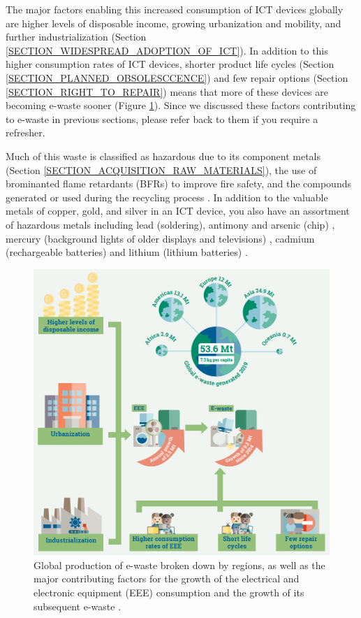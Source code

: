 \documentclass{article}
\begin{document}
The major factors enabling this increased consumption of ICT devices globally are higher levels of disposable income, growing urbanization and mobility, and further industrialization (Section \ref{SECTION_WIDESPREAD_ADOPTION_OF_ICT}). In addition to this higher consumption rates of ICT devices, shorter product life cycles (Section \ref{SECTION_PLANNED_OBSOLESCCENCE}) and few repair options (Section \ref{SECTION_RIGHT_TO_REPAIR}) means that more of these devices are becoming e-waste sooner (Figure \ref{Global_e_waste_stats}). Since we discussed these factors contributing to e-waste in previous sections, please refer back to them if you require a refresher.

Much of this waste is classified as hazardous due to its component metals (Section \ref{SECTION_ACQUISITION_RAW_MATERIALS}), the use of brominanted flame retardants (BFRs) to improve fire safety, and the compounds generated or used during the recycling process \cite{williams2011environmental, forti2020global}. In addition to the valuable metals of copper, gold, and silver in an ICT device, you also have an assortment of hazardous metals including lead (soldering), antimony and arsenic (chip) \cite{compoundinterest2014, williams2011environmental}, mercury (background lights of older displays and televisions) \cite{balde2018waste}, cadmium (rechargeable batteries)  \cite{williams2011environmental, forti2020global} and lithium (lithium batteries) \cite{compoundinterest2014, kumar2017waste}.

\begin{figure}[h]
    \includegraphics[width=.8 \textwidth]{./images/e-waste_global.png}
    \centering
    \caption{Global production of e-waste broken down by regions, as well as the major contributing factors for the growth of the electrical and electronic equipment (EEE) consumption and the growth of its subsequent e-waste \cite{forti2020global}.}
    \label{Global_e_waste_stats}
\end{figure}
\end{document}
